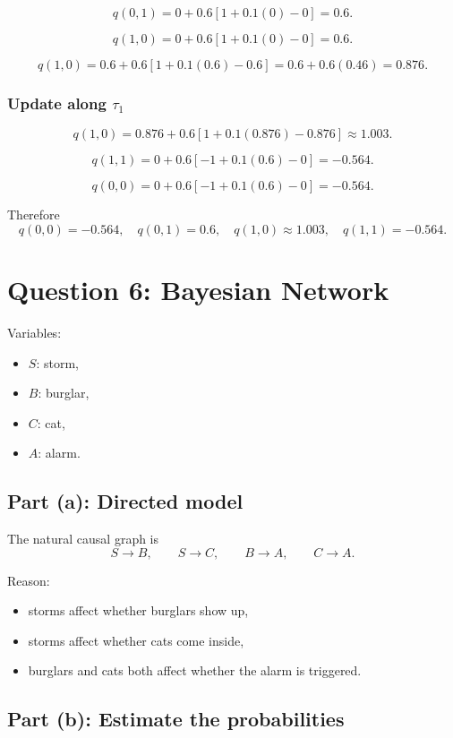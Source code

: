 \documentclass[11pt]{article}
\begin{document}
\[
    q(0,1)=0+0.6[1+0.1(0)-0]=0.6.
\]

\[
    q(1,0)=0+0.6[1+0.1(0)-0]=0.6.
\]

\[
    q(1,0)=0.6+0.6[1+0.1(0.6)-0.6]
    =0.6+0.6(0.46)=0.876.
\]

\subsubsection*{Update along \(\tau_1\)}

\[
    q(1,0)=0.876+0.6[1+0.1(0.876)-0.876]
    \approx 1.003.
\]

\[
    q(1,1)=0+0.6[-1+0.1(0.6)-0]=-0.564.
\]

\[
    q(0,0)=0+0.6[-1+0.1(0.6)-0]=-0.564.
\]

Therefore
\[
    \boxed{
    q(0,0)=-0.564,\quad
    q(0,1)=0.6,\quad
    q(1,0)\approx 1.003,\quad
    q(1,1)=-0.564
    }.
\]

\section*{Question 6: Bayesian Network}

Variables:
\begin{itemize}
    \item \(S\): storm,
    \item \(B\): burglar,
    \item \(C\): cat,
    \item \(A\): alarm.
\end{itemize}

\subsection*{Part (a): Directed model}

The natural causal graph is
\[
    S \to B,\qquad S \to C,\qquad B \to A,\qquad C \to A.
\]

Reason:
\begin{itemize}
    \item storms affect whether burglars show up,
    \item storms affect whether cats come inside,
    \item burglars and cats both affect whether the alarm is triggered.
\end{itemize}

\subsection*{Part (b): Estimate the probabilities}
\end{document}
